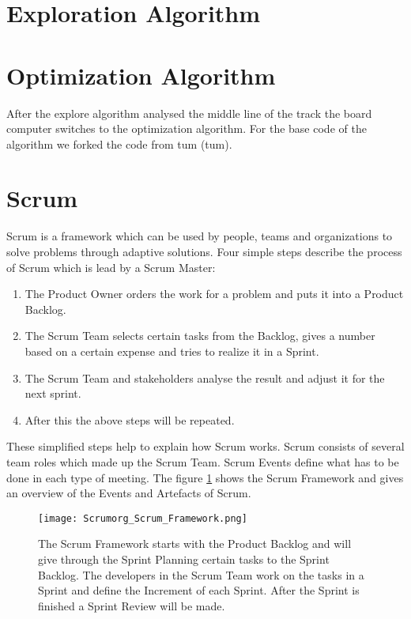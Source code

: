 \section{Exploration Algorithm}


\section{Optimization Algorithm}
After the explore algorithm analysed the middle line of the track the board computer switches to the optimization algorithm. For the base code of the algorithm we forked the code from \acrlong{tum} (\acrshort{tum}). \cite{tumftm_optimization_algoritm} 

\section{Scrum}
Scrum is a framework which can be used by people, teams and organizations to solve problems through adaptive solutions. Four simple steps describe the process of Scrum which is lead by a Scrum Master:
\begin{enumerate}
    \item The Product Owner orders the work for a problem and puts it into a Product Backlog.
    \item The Scrum Team selects certain tasks from the Backlog, gives a number based on a certain expense and tries to realize it in a Sprint.
    \item The Scrum Team and stakeholders analyse the result and adjust it for the next sprint.
    \item After this the above steps will be repeated.
\end{enumerate}

These simplified steps help to explain how Scrum works. Scrum consists of several team roles which made up the Scrum Team. Scrum Events define what has to be done in each type of meeting. The figure \ref{fig:Scrum Framework} shows the Scrum Framework and gives an overview of the Events and Artefacts of Scrum. \cite{scrum_guide}


\begin{figure}[H]
    \centering
    \texttt{[image: Scrumorg\_Scrum\_Framework.png]}
    \caption{The Scrum Framework starts with the Product Backlog and will give through the Sprint Planning certain tasks to the Sprint Backlog. The developers in the Scrum Team work on the tasks in a Sprint and define the Increment of each Sprint. After the Sprint is finished a Sprint Review will be made. \cite{scrum_guide}}
    \label{fig:Scrum Framework}
\end{figure}


